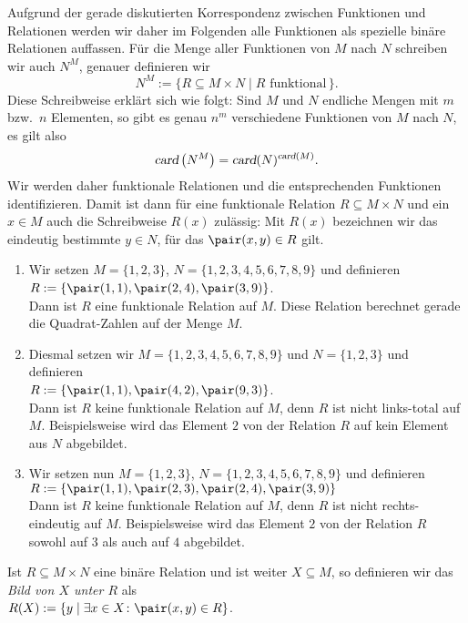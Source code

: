 Aufgrund der gerade diskutierten Korrespondenz zwischen Funktionen und Relationen
werden wir daher im Folgenden alle Funktionen als spezielle bin\"{a}re Relationen auffassen.
F\"{u}r die Menge aller Funktionen von $M$ nach $N$ schreiben wir auch $N^M$, genauer
definieren wir
\[ N^M := \{ R \subseteq M \times N \mid \mbox{$R$ funktional}\, \}. \]
Diese Schreibweise erkl\"{a}rt sich wie folgt: Sind $M$ und $N$ endliche Mengen mit $m$
bzw.~$n$ Elementen, so gibt es genau $n^m$ verschiedene Funktionen von $M$ nach $N$, es
gilt also
\[ \textsl{card}\left(N^M\right) = \textsl{card}(N)^{\textsl{card}(M)}. \]
Wir werden daher funktionale Relationen und die entsprechenden Funktionen identifizieren.
Damit ist dann f\"{u}r eine funktionale Relation $R \subseteq M \times N$ und ein $x \in M$
auch die Schreibweise $R(x)$ zul\"{a}ssig: Mit $R(x)$ bezeichnen wir das eindeutig bestimmte $y \in N$,
f\"{u}r das $\pair(x,y) \in R$ gilt.

\examples
\begin{enumerate}
\item Wir setzen $M = \{1,2,3\}$, $N = \{1,2,3,4,5,6,7,8,9\}$ und definieren \\[0.2cm]
      \hspace*{1.3cm} $R := \{ \pair(1,1),\pair(2,4),\pair(3,9) \}$. \\[0.2cm]
      Dann ist $R$ eine funktionale Relation auf $M$.  Diese Relation berechnet
      gerade die Quadrat-Zahlen auf der Menge $M$.
\item Diesmal setzen wir $M = \{1,2,3,4,5,6,7,8,9\}$ und $N = \{1,2,3\}$ und definieren \\[0.2cm]
      \hspace*{1.3cm} $R := \{ \pair(1,1),\pair(4,2),\pair(9,3) \}$. \\[0.2cm]
      Dann ist $R$ keine funktionale Relation auf $M$, denn $R$ ist nicht links-total auf
      $M$.  Beispielsweise wird das Element $2$ von der Relation $R$ auf kein Element aus 
      $N$ abgebildet.
\item Wir setzen nun  $M = \{1,2,3\}$, $N = \{1,2,3,4,5,6,7,8,9\}$ und definieren \\[0.2cm]
      \hspace*{1.3cm} $R := \{ \pair(1,1),\pair(2,3),\pair(2,4),\pair(3,9) \}$ \\[0.2cm]
      Dann ist $R$ keine funktionale Relation auf $M$, denn $R$ ist nicht rechts-eindeutig auf
      $M$.  Beispielsweise wird das Element $2$ von der Relation $R$ sowohl auf $3$ als
      auch auf $4$ abgebildet. \eox
\end{enumerate}
Ist $R \subseteq M \times N$ eine bin\"{a}re Relation und ist weiter $X \subseteq M$, so
definieren wir das \emph{Bild von $X$ unter $R$} als \\[0.2cm]
\hspace*{1.3cm} $R(X) := \{ y \mid \exists x \in X \colon \pair(x,y) \in R \}$. 

